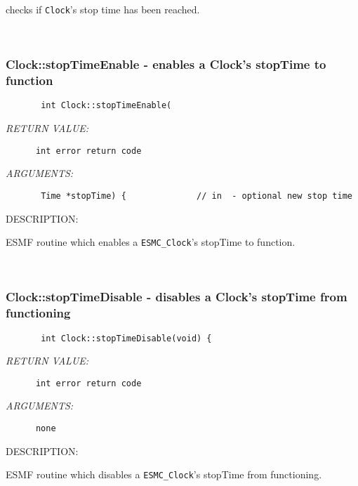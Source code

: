       checks if {\tt Clock}'s stop time has been reached.
   
 
\mbox{}\hrulefill\ 
 
\subsubsection [Clock::stopTimeEnable] {Clock::stopTimeEnable - enables a Clock's stopTime to function}


  
\begin{verbatim}       int Clock::stopTimeEnable(\end{verbatim}{\em RETURN VALUE:}
\begin{verbatim}      int error return code\end{verbatim}{\em ARGUMENTS:}
\begin{verbatim}       Time *stopTime) {              // in  - optional new stop time\end{verbatim}
{\sf DESCRIPTION:\\ }


        ESMF routine which enables a {\tt ESMC\_Clock}'s stopTime to function.
   
 
\mbox{}\hrulefill\ 
 
\subsubsection [Clock::stopTimeDisable] {Clock::stopTimeDisable - disables a Clock's stopTime from functioning}


  
\begin{verbatim}       int Clock::stopTimeDisable(void) {\end{verbatim}{\em RETURN VALUE:}
\begin{verbatim}      int error return code\end{verbatim}{\em ARGUMENTS:}
\begin{verbatim}      none\end{verbatim}
{\sf DESCRIPTION:\\ }


        ESMF routine which disables a {\tt ESMC\_Clock}'s stopTime from
        functioning.
   
